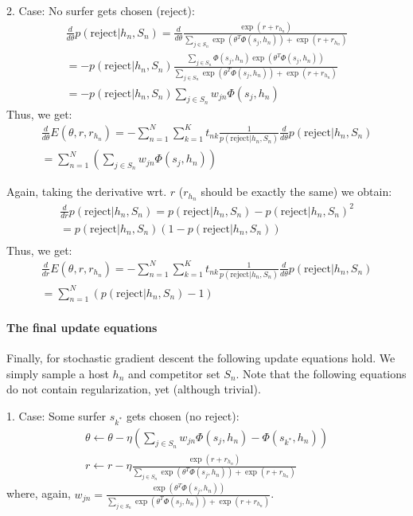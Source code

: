 2. Case: No surfer gets chosen (reject):
\begin{eqnarray}
\frac{d}{d \theta} p(\text{reject} | h_n, S_n) = \frac{d}{d \theta} \frac{\exp(r+r_{h_n})}{\sum_{j \in S_n} \exp(\theta^T \Phi(s_j,h_n)) + \exp(r + r_{h_n})}\\
= - p(\text{reject} | h_n, S_n) \frac{\sum_{j \in S_n} \Phi(s_j,h_n) \exp(\theta^T \Phi(s_j,h_n))}{\sum_{j \in S_n} \exp(\theta^T \Phi(s_j,h_n)) + \exp(r + r_{h_n})} \\
= - p(\text{reject} | h_n, S_n) \sum_{j \in S_n} w_{jn} \Phi(s_j,h_n)
\end{eqnarray}
Thus, we get:
\begin{eqnarray}
\frac{d}{d \theta} E(\theta, r, r_{h_n}) = - \sum_{n=1}^N \sum_{k=1}^K t_{nk} \frac{1}{p(\text{reject} | h_n, S_n)} \frac{d}{d \theta} p(\text{reject} | h_n, S_n)\\
= \sum_{n=1}^N (\sum_{j \in S_n} w_{jn} \Phi(s_j,h_n))
\end{eqnarray}



Again, taking the derivative wrt. $r$ ($r_{h_n}$ should be exactly the same) we obtain:
\begin{eqnarray}
\frac{d}{d r} p(\text{reject} | h_n, S_n) = p(\text{reject} | h_n, S_n) - p(\text{reject} | h_n, S_n)^2\\
= p(\text{reject} | h_n, S_n) (1 - p(\text{reject} | h_n, S_n))\\
\end{eqnarray}
Thus, we get:
\begin{eqnarray}
\frac{d}{d r} E(\theta, r, r_{h_n}) = - \sum_{n=1}^N \sum_{k=1}^K t_{nk} \frac{1}{p(\text{reject} | h_n, S_n)} \frac{d}{d \theta} p(\text{reject} | h_n, S_n)\\
= \sum_{n=1}^N (p(\text{reject} | h_n, S_n)-1)
\end{eqnarray}


\paragraph{The final update equations}

Finally, for stochastic gradient descent the following update equations hold. We simply sample a host $h_n$ and competitor set $S_n$. Note that the following equations do not contain regularization, yet (although trivial).

1. Case: Some surfer $s_{k^*}$ gets chosen (no reject):
\begin{eqnarray}
\theta \leftarrow \theta - \eta (\sum_{j \in S_n} w_{jn} \Phi(s_j,h_n) - \Phi(s_{k^*},h_n))\\
r \leftarrow r - \eta \frac{\exp(r + r_{h_n})}{\sum_{j \in S_n} \exp(\theta^T \Phi(s_j,h_n)) + \exp(r + r_{h_n})}
\end{eqnarray}
where, again, $w_{jn}=\frac{\exp(\theta^T \Phi(s_j,h_n))}{\sum_{j \in S_n} \exp(\theta^T \Phi(s_j,h_n)) + \exp(r + r_{h_n})}$.

